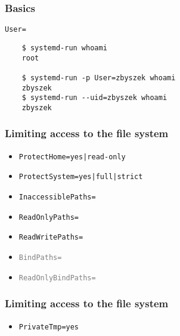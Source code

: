 \documentclass[serif]{beamer}
\begin{document}
\begin{frame}[fragile]
  \frametitle{Basics}
  \texttt{User=}

  \medskip
  \pause

  \begin{verbatim}
    $ systemd-run whoami
    root

    $ systemd-run -p User=zbyszek whoami
    zbyszek
    $ systemd-run --uid=zbyszek whoami
    zbyszek
  \end{verbatim}
\end{frame}

\begin{frame}
  \frametitle{Limiting access to the file system}
  \begin{itemize}
  \item \texttt{ProtectHome=yes|read-only}
  \item \texttt{ProtectSystem=yes|full|strict}
    \pause

  \item \texttt{InaccessiblePaths=}
  \item \texttt{ReadOnlyPaths=}
  \item \texttt{ReadWritePaths=}

    \pause
  \item \texttt{\textcolor{gray}{BindPaths=}}
  \item \texttt{\textcolor{gray}{ReadOnlyBindPaths=}}

  \end{itemize}
\end{frame}

\begin{frame}
  \frametitle{Limiting access to the file system}

  \begin{itemize}
  \item \texttt{PrivateTmp=yes}
  \end{itemize}
\end{frame}
\end{document}
